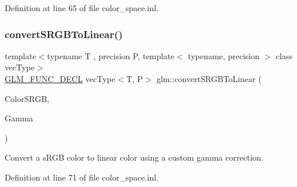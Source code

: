 Definition at line 65 of file color\+\_\+space.\+inl.

\mbox{\label{group__gtc__color__space_ga61c4f0efdf55c29d9cfbd26141fddef8}} 
\subsubsection{\texorpdfstring{convertSRGBToLinear()}{convertSRGBToLinear()}\hspace{0.1cm}{\footnotesize\ttfamily [2/2]}}
{\footnotesize\ttfamily template$<$typename T , precision P, template$<$ typename, precision $>$ class vec\+Type$>$ \\
\mbox{\hyperlink{setup_8hpp_ab2d052de21a70539923e9bcbf6e83a51}{G\+L\+M\+\_\+\+F\+U\+N\+C\+\_\+\+D\+E\+CL}} vec\+Type$<$T, P$>$ glm\+::convert\+S\+R\+G\+B\+To\+Linear (\begin{DoxyParamCaption}\item[{vec\+Type$<$ T, P $>$ const \&}]{Color\+S\+R\+GB,  }\item[{T}]{Gamma }\end{DoxyParamCaption})}



Convert a s\+R\+GB color to linear color using a custom gamma correction. 



Definition at line 71 of file color\+\_\+space.\+inl.

